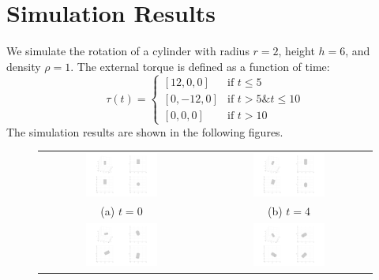 \documentclass{article}
\begin{document}
\section*{Simulation Results}
We simulate the rotation of a cylinder with radius $r = 2$, height $h = 6$, and density $\rho = 1$. The external torque is defined as a function of time:
\begin{equation}
  \tau(t) = 
  \begin{cases} 
    [12, 0, 0] & \text{if } t \leq 5 \\
    [0, -12, 0] & \text{if } t > 5 \& t \leq 10 \\
    [0, 0, 0] & \text{if } t > 10
  \end{cases}
\end{equation}
The simulation results are shown in the following figures.
\begin{figure}[h!]
  \centering
  \begin{tabular}{cc}
    \includegraphics[width=0.45\textwidth]{assets/figure_0.png} & \includegraphics[width=0.45\textwidth]{assets/figure_4.png} \\
    (a) $t = 0$ & (b) $t = 4$ \\
    \includegraphics[width=0.45\textwidth]{assets/figure_8.png} & \includegraphics[width=0.45\textwidth]{assets/figure_12.png} \\

\end{tabular}
\end{figure}
\end{document}
